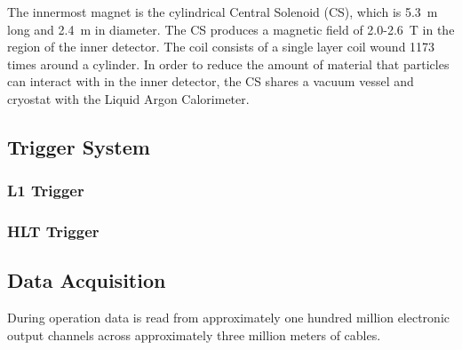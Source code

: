 The innermost magnet is the cylindrical Central Solenoid (CS), which is 5.3~m long and 2.4~m in diameter.
The CS produces a magnetic field of 2.0-2.6~T in the region of the inner detector.
The coil consists of a single layer coil wound 1173 times around a cylinder.
In order to reduce the amount of material that particles can interact with in the inner detector, the CS shares a vacuum vessel and cryostat with the Liquid Argon Calorimeter.
\cite{atlasFacts}
\cite{magnetTdr}

\subsection{Trigger System}
\subsubsection{L1 Trigger}
\subsubsection{HLT Trigger}

\subsection{Data Acquisition}

During operation data is read from approximately one hundred million electronic output channels across approximately three million meters of cables. \cite{atlasFacts}


